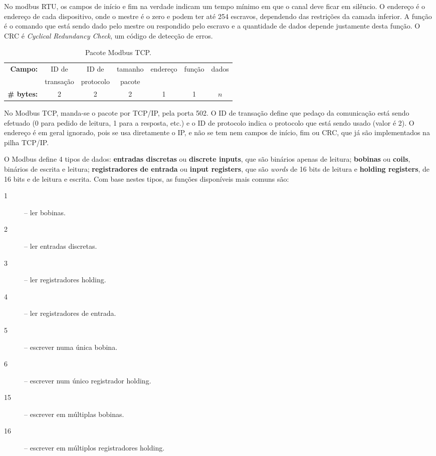 No modbus RTU, os campos de início e fim na verdade indicam um tempo mínimo em que o canal deve ficar em silêncio. O endereço é o endereço de cada dispositivo, onde o mestre é o zero e podem ter até 254 escravos, dependendo das restrições da camada inferior. A função é o comando que está sendo dado pelo mestre ou respondido pelo escravo e a quantidade de dados depende justamente desta função. O CRC é \emph{Cyclical Redundancy Check}, um código de detecção de erros.

\begin{table}
    \centering
    \caption{Pacote Modbus TCP.}\label{tab:mbtcp}
    \begin{tabular}{r|c|c|c|c|c|c|}
        \cline{2-7}
        \textbf{Campo:} & ID de & ID de & tamanho & endereço & função & dados \\
         & transação & protocolo & pacote &  &  &  \\
        \cline{2-7}
        \textbf{\# bytes:} & 2 & 2 & 2 & 1 & 1 & $n$ \\
        \cline{2-7}
    \end{tabular}
\end{table}

No Modbus TCP, manda-se o pacote por TCP/IP, pela porta 502. O ID de transação define que pedaço da comunicação está sendo efetuado (0 para pedido de leitura, 1 para a resposta, etc.) e o ID de protocolo indica o protocolo que está sendo usado (valor é 2). O endereço é em geral ignorado, pois se usa diretamente o IP, e não se tem nem campos de início, fim ou CRC, que já são implementados na pilha TCP/IP.

O Modbus define 4 tipos de dados: \textbf{entradas discretas} ou \textbf{discrete inputs}, que são binários apenas de leitura; \textbf{bobinas} ou \textbf{coils}, binários de escrita e leitura; \textbf{registradores de entrada} ou \textbf{input registers}, que são \emph{words} de 16 bits de leitura e \textbf{holding registers}, de 16 bits e de leitura e escrita. Com base nestes tipos, as funções disponíveis mais comuns são:
\begin{description}
    \item[1] -- ler bobinas.
    \item[2] -- ler entradas discretas.
    \item[3] -- ler registradores holding.
    \item[4] -- ler registradores de entrada.
    \item[5] -- escrever numa única bobina.
    \item[6] -- escrever num único registrador holding.
    \item[15] -- escrever em múltiplas bobinas.
    \item[16] --  escrever em múltiplos registradores holding.
\end{description}

